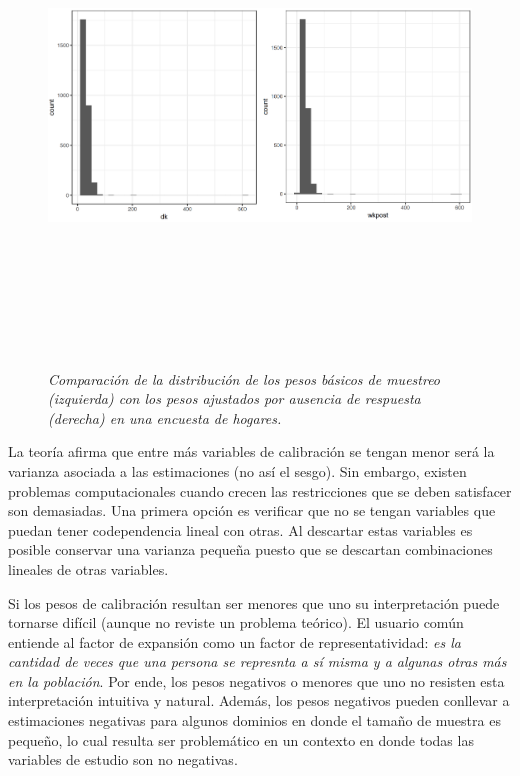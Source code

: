 \begin{figure}
\centering
\includegraphics[width=\textwidth,height=5.20833in]{Pics/18.png}
\caption{\emph{Comparación de la distribución de los pesos básicos de muestreo (izquierda) con los pesos ajustados por ausencia de respuesta (derecha) en una encuesta de hogares.}}
\end{figure}

La teoría afirma que entre más variables de calibración se tengan menor será la varianza asociada a las estimaciones (no así el sesgo). Sin embargo, existen problemas computacionales cuando crecen las restricciones que se deben satisfacer son demasiadas. Una primera opción es verificar que no se tengan variables que puedan tener codependencia lineal con otras. Al descartar estas variables es posible conservar una varianza pequeña puesto que se descartan combinaciones lineales de otras variables.

Si los pesos de calibración resultan ser menores que uno su interpretación puede tornarse difícil (aunque no reviste un problema teórico). El usuario común entiende al factor de expansión como un factor de representatividad: \emph{es la cantidad de veces que una persona se represnta a sí misma y a algunas otras más en la población}. Por ende, los pesos negativos o menores que uno no resisten esta interpretación intuitiva y natural. Además, los pesos negativos pueden conllevar a estimaciones negativas para algunos dominios en donde el tamaño de muestra es pequeño, lo cual resulta ser problemático en un contexto en donde todas las variables de estudio son no negativas.

